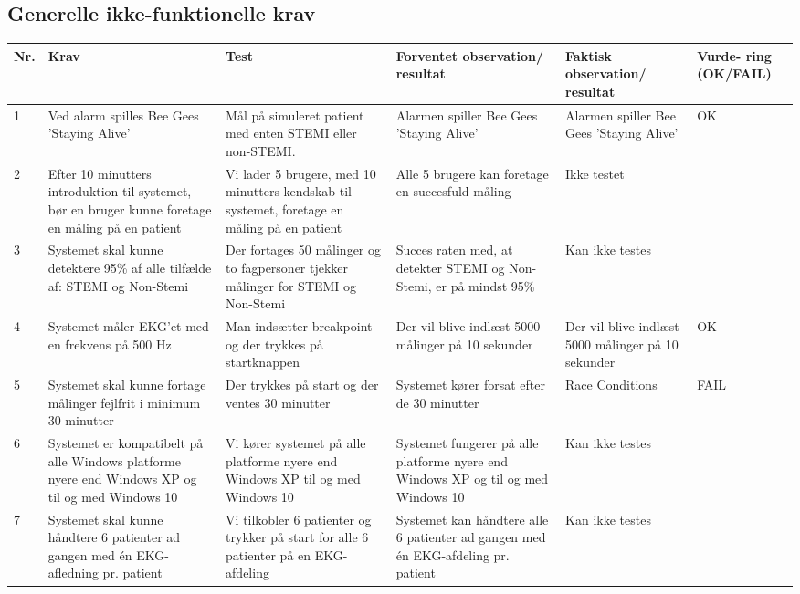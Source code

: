 \subsection{Generelle ikke-funktionelle krav}
\begin{table}[H]
\begin{tabular}{|p{0.5cm}|p{4cm}|p{3cm}|p{3cm}|p{3cm}|p{1cm}|}
\hline
\textbf{Nr.} & \textbf{Krav} & \textbf{Test}& \textbf{Forventet observation/ resultat}& \textbf{Faktisk observation/ resultat}& \textbf{Vurde- ring (OK/FAIL)}\\\hline
 1 & Ved alarm spilles Bee Gees 'Staying Alive' & Mål på simuleret patient med enten STEMI eller non-STEMI. & Alarmen spiller Bee Gees 'Staying Alive' & Alarmen spiller Bee Gees 'Staying Alive' & OK\\\hline
 2 & Efter 10 minutters introduktion til systemet, bør en bruger kunne foretage en måling på en patient & Vi lader 5 brugere, med 10 minutters kendskab til systemet, foretage en måling på en patient & Alle 5 brugere kan foretage en succesfuld måling & Ikke testet &  \\\hline
 3 & Systemet skal kunne detektere 95\% af alle tilfælde af: STEMI og Non-Stemi & Der fortages 50 målinger og to fagpersoner tjekker målinger for STEMI og Non-Stemi & Succes raten med, at detekter STEMI og Non-Stemi, er på mindst 95\% & Kan ikke testes & \\\hline
 4 & Systemet måler EKG'et med en frekvens på 500 Hz & Man indsætter breakpoint og der trykkes på startknappen & Der vil blive indlæst 5000 målinger på 10 sekunder & Der vil blive indlæst 5000 målinger på 10 sekunder & OK \\\hline
 5 & Systemet skal kunne fortage målinger fejlfrit i minimum 30 minutter & Der trykkes på start og der ventes 30 minutter & Systemet kører forsat efter de 30 minutter & Race Conditions & FAIL \\\hline
 6 & Systemet er kompatibelt på alle Windows platforme nyere end Windows XP og til og med Windows 10 & Vi kører systemet på alle platforme nyere end Windows XP til og med Windows 10 & Systemet fungerer på alle platforme nyere end Windows XP og til og med Windows 10 & Kan ikke testes & \\\hline
 7 & Systemet skal kunne håndtere 6 patienter ad gangen med én EKG-afledning pr. patient & Vi tilkobler 6 patienter og trykker på start for alle 6 patienter på en EKG-afdeling & Systemet kan håndtere alle 6 patienter ad gangen med én EKG-afdeling pr. patient & Kan ikke testes&  \\\hline
\end{tabular}
\end{table}

